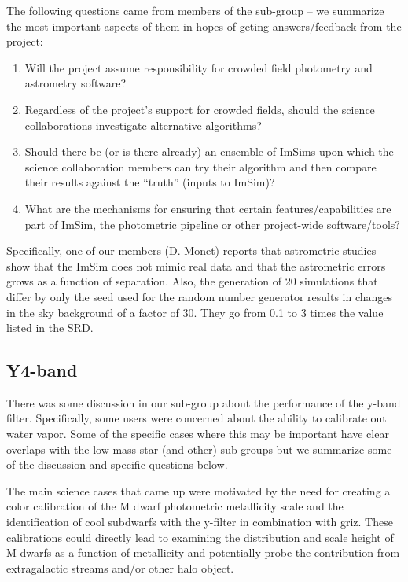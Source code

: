 The following questions came from members of the sub-group – we summarize the most important aspects of them in hopes of geting answers/feedback from the project: 
\begin{enumerate}
\item Will the project assume responsibility for crowded field photometry and astrometry software? 
\item Regardless of the project's support for crowded fields, should the science collaborations investigate alternative algorithms? 
\item Should there be (or is there already) an ensemble of ImSims upon which the science collaboration members can try their algorithm and then compare their results against the “truth” (inputs to ImSim)? 
\item What are the mechanisms for ensuring that certain features/capabilities are part of ImSim, the photometric pipeline or other project-wide software/tools? 
\end{enumerate}

Specifically, one of our members (D. Monet) reports that astrometric studies show that the ImSim does not
mimic real data and that the astrometric errors grows as a function of separation. 
Also, the generation of 20 simulations that differ by only the seed used for the random number generator
 results in changes in the sky background of a factor of 30. 
They go from 0.1 to 3 times the value listed in the SRD. 

\subsection{Y4-band}
 There was some discussion in our sub-group about the performance of the y-band filter. 
Specifically, some users were concerned about the ability to calibrate out water vapor. 
Some of the specific cases where this may be important have clear overlaps with the low-mass star 
(and other) sub-groups but we summarize some of the discussion and specific questions below. 

The main science cases that came up were motivated by the need for creating a color calibration of the 
M dwarf photometric metallicity scale and the identification of cool subdwarfs with the y-filter in 
combination with griz. These calibrations could directly lead to examining the distribution and scale 
height of M dwarfs as a function of metallicity and potentially probe the contribution from 
extragalactic streams and/or other halo object. 

